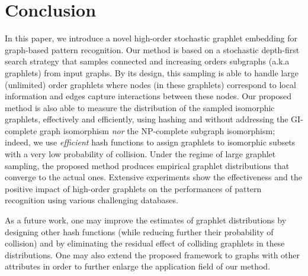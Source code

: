\documentclass[journal]{IEEEtran}
\theoremstyle{definition}
\begin{document}
\begin{table}[!htbp]
\begin{center}
\caption{Accuracies (in \%) obtained by our method with a combination of different graphlet orders (values of $t$) on the MNIST dataset. {The average processing time for generating the embedding of a given graph is indicated within the parenthesis after each accuracy value.}}
\label{tab:mnist}
\end{center}
\end{table}
 
\section{Conclusion}
\label{sec:concl}

In this paper, we introduce a novel high-order stochastic graphlet embedding for graph-based pattern recognition. Our method is based on a stochastic depth-first search strategy that samples connected and increasing orders subgraphs (a.k.a graphlets) from input graphs. By its design, this sampling is able to handle large (unlimited) order graphlets where nodes (in these graphlets) correspond to local information and edges capture interactions between these nodes. Our proposed method is also able to measure the distribution of the sampled isomorphic graphlets, effectively and efficiently, using hashing and without addressing the GI-complete graph isomorphism {\it nor} the NP-complete subgraph isomorphism; indeed, we use {\it efficient} hash functions to assign graphlets to isomorphic subsets with a very low probability of collision. Under the regime of large graphlet sampling, the proposed method produces empirical graphlet distributions that converge to the actual ones. Extensive experiments show the effectiveness and the positive impact of high-order graphlets on the performances of pattern recognition using various challenging databases.

As a future work, one may improve the estimates of graphlet distributions by designing other hash functions (while reducing further their probability of collision) and by eliminating the residual effect of colliding graphlets in these distributions. One may also extend the proposed framework to graphs with other attributes in order to further enlarge the application field of our method.
\end{document}
